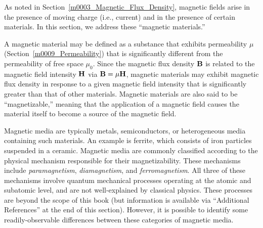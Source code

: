 

\label{m0058_Magnetic_Materials} %

As noted in Section~\ref{m0003_Magnetic_Flux_Density}, magnetic fields arise in the presence of moving charge (i.e., current) and in the presence of certain materials.
In this section, we address these ``magnetic materials.''

A magnetic material may be defined as a substance that exhibits permeability 
$\mu$ (Section~\ref{m0009_Permeability}) that is significantly different from the permeability of free space $\mu_0$.
Since the magnetic flux density ${\bf B}$ is related to the magnetic field intensity ${\bf H}$ via ${\bf B}=\mu{\bf H}$, magnetic materials may exhibit magnetic flux density in response to a given magnetic field intensity that is significantly greater than that of other materials.  
Magnetic materials are also said to be ``magnetizable,'' meaning that the application of a magnetic field causes the material itself to become a source of the magnetic field.

Magnetic media are typically metals, semiconductors, or heterogeneous media containing such materials. An example is ferrite, 
which consists of iron particles suspended in a ceramic.
Magnetic media are commonly classified according to the physical mechanism responsible for their magnetizability.
These mechanisms include \emph{paramagnetism}, \emph{diamagnetism}, and \emph{ferromagnetism}.
All three of these mechanisms involve quantum mechanical processes operating at the atomic and subatomic level, and are not well-explained by classical physics.
These processes are beyond the scope of this book (but information is available via ``Additional References'' at the end of this section).
However, it is possible to identify some readily-observable differences between these categories of magnetic media.

